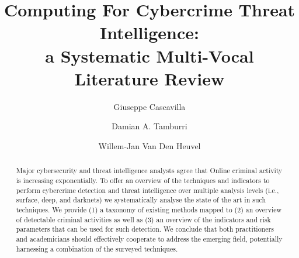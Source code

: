 \documentclass[manuscript, review, screen, CSUR]{acmart}
\begin{document}
\title{Computing For Cybercrime Threat Intelligence:\\ a Systematic Multi-Vocal Literature Review}

\author{Giuseppe Cascavilla}

\author{Damian A. Tamburri}

\author{Willem-Jan Van Den Heuvel}



\begin{abstract}
Major cybersecurity and threat intelligence analysts agree that Online criminal activity is increasing exponentially. To offer an overview of the techniques and indicators to perform cybercrime detection and threat intelligence over multiple analysis levels (i.e., surface, deep, and darknets) we systematically analyse the state of the art in such techniques. We provide (1) a taxonomy of existing methods mapped to (2) an overview of detectable criminal activities as well as (3) an overview of the indicators and risk parameters that can be used for such detection. We conclude that both practitioners and academicians should effectively cooperate to address the emerging field, potentially harnessing a combination of the surveyed techniques.
\end{abstract}
\end{document}
